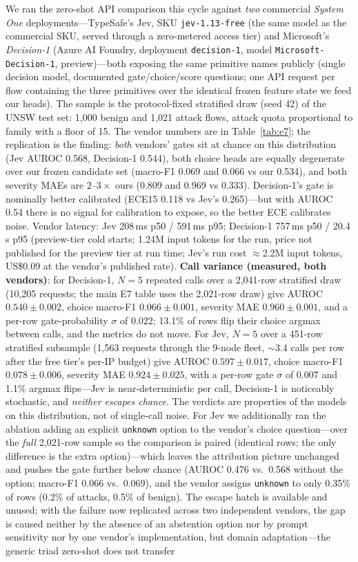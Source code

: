 \documentclass[sigconf,anonymous=false]{acmart}
\begin{document}
We ran the zero-shot API comparison this cycle against \emph{two} commercial \emph{System One} deployments---TypeSafe's Jev, SKU \texttt{jev-1.13-free} (the same model as the commercial SKU, served through a zero-metered access tier) and Microsoft's \emph{Decision-1} (Azure AI Foundry, deployment \texttt{decision-1}, model \texttt{Microsoft-Decision-1}, preview)---both exposing the same primitive names publicly (single decision model, documented gate/choice/score questions; one API request per flow containing the three primitives over the identical frozen feature state we feed our heads). The sample is the protocol-fixed stratified draw (seed 42) of the UNSW test set: 1{,}000 benign and 1{,}021 attack flows, attack quota proportional to family with a floor of 15. The vendor numbers are in Table~\ref{tab:e7}; the replication is the finding: \emph{both} vendors' gates sit at chance on this distribution (Jev AUROC 0.568, Decision-1 0.544), both choice heads are equally degenerate over our frozen candidate set (macro-F1 0.069 and 0.066 vs our 0.534), and both severity MAEs are $2$--$3\times$ ours (0.809 and 0.969 vs 0.333). Decision-1's gate is nominally better calibrated (ECE15 0.118 vs Jev's 0.265)---but with AUROC 0.54 there is no signal for calibration to expose, so the better ECE calibrates noise. Vendor latency: Jev 208\,ms p50 / 591\,ms p95; Decision-1 757\,ms p50 / 20.4\,s p95 (preview-tier cold starts; 1.24M input tokens for the run, price not published for the preview tier at run time; Jev's run cost $\approx$2.2M input tokens, US\$0.09 at the vendor's published rate). \textbf{Call variance (measured, both vendors)}: for Decision-1, $N{=}5$ repeated calls over a 2{,}041-row stratified draw (10{,}205 requests; the main E7 table uses the 2{,}021-row draw) give AUROC $0.540\pm0.002$, choice macro-F1 $0.066\pm0.001$, severity MAE $0.960\pm0.001$, and a per-row gate-probability $\sigma$ of 0.022; 13.1\% of rows flip their choice argmax between calls, and the metrics do not move. For Jev, $N{=}5$ over a 451-row stratified subsample (1{,}563 requests through the 9-node fleet, $\sim$3.4 calls per row after the free tier's per-IP budget) give AUROC $0.597\pm0.017$, choice macro-F1 $0.078\pm0.006$, severity MAE $0.924\pm0.025$, with a per-row gate $\sigma$ of 0.007 and 1.1\% argmax flips---Jev is near-deterministic per call, Decision-1 is noticeably stochastic, and \emph{neither escapes chance}. The verdicts are properties of the models on this distribution, not of single-call noise. For Jev we additionally ran the ablation adding an explicit \texttt{unknown} option to the vendor's choice question---over the \emph{full} 2{,}021-row sample so the comparison is paired (identical rows; the only difference is the extra option)---which leaves the attribution picture unchanged and pushes the gate further below chance (AUROC 0.476 vs.\ 0.568 without the option; macro-F1 0.066 vs.\ 0.069), and the vendor assigns \texttt{unknown} to only 0.35\% of rows (0.2\% of attacks, 0.5\% of benign). The escape hatch is available and unused; with the failure now replicated across two independent vendors, the gap is caused neither by the absence of an abstention option nor by prompt sensitivity nor by one vendor's implementation, but domain adaptation---the generic triad zero-shot does not transfer 
\end{document}
